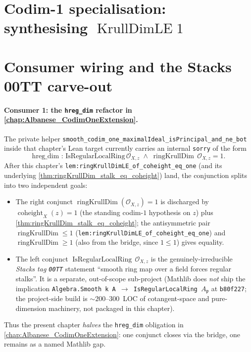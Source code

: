 \section{Codim-1 specialisation: synthesising \texorpdfstring{\(\operatorname{KrullDimLE} 1\)}{KrullDimLE 1}}
\label{sec:coheight_le_one_instance}



\section{Consumer wiring and the Stacks 00TT carve-out}
\label{sec:coheight_consumers}

\paragraph{Consumer 1: the \texttt{hreg\_dim} refactor in
\texorpdfstring{\cref{chap:Albanese_CodimOneExtension}}{the codim-1 extension chapter}.}
The private helper
\texttt{smooth\_codim\_one\_maximalIdeal\_isPrincipal\_and\_ne\_bot}
inside that chapter's Lean target currently carries an internal
\texttt{sorry} of the form
\[
  \text{hreg\_dim : IsRegularLocalRing}\,\mathcal{O}_{X,z}\;\wedge\;
  \operatorname{ringKrullDim}\,\mathcal{O}_{X,z} = 1.
\]
After this chapter's
\texttt{lem:ringKrullDimLE_of_coheight_eq_one} (and its underlying
\cref{thm:ringKrullDim_stalk_eq_coheight}) land, the conjunction splits into
two independent goals:
\begin{itemize}
  \item The right conjunct \(\operatorname{ringKrullDim}(\mathcal{O}_{X,z}) = 1\)
    is discharged by
    \(\operatorname{coheight}_{X}(z) = 1\) (the standing codim-\(1\) hypothesis
    on \(z\)) plus \cref{thm:ringKrullDim_stalk_eq_coheight}; the antisymmetric
    pair \(\operatorname{ringKrullDim} \leq 1\) (\texttt{lem:ringKrullDimLE_of_coheight_eq_one})
    and \(\operatorname{ringKrullDim} \geq 1\) (also from the bridge, since
    \(1 \leq 1\)) gives equality.
  \item The left conjunct \(\operatorname{IsRegularLocalRing}\,\mathcal{O}_{X,z}\)
    is the genuinely-irreducible \emph{Stacks tag \texttt{00TT}} statement
    ``smooth ring map over a field forces regular stalks''. It is a separate,
    out-of-scope sub-project (Mathlib does \emph{not} ship the implication
    \texttt{Algebra.Smooth k A \(\to\) IsRegularLocalRing \(A_{\mathfrak{p}}\)} at
    \texttt{b80f227}; the project-side build is \(\sim 200\)--\(300\)~LOC of
    cotangent-space and pure-dimension machinery, not packaged in this
    chapter).
\end{itemize}
Thus the present chapter \emph{halves} the \texttt{hreg\_dim} obligation in
\cref{chap:Albanese_CodimOneExtension}: one conjunct closes via the bridge,
one remains as a named Mathlib gap.

